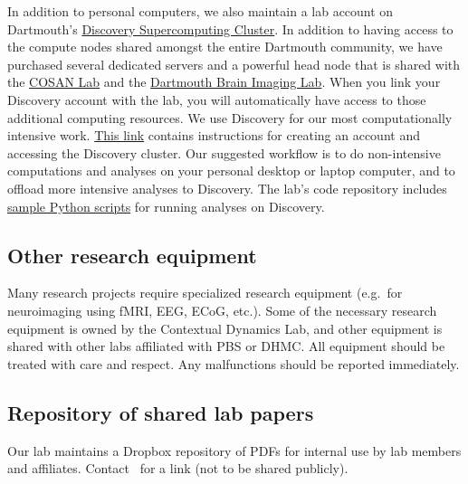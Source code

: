 \documentclass{tufte-book} %
\begin{document}
 In addition to personal computers, we also maintain a lab account on
 Dartmouth's \href{http://techdoc.dartmouth.edu/discovery/}{Discovery
   Supercomputing Cluster}.  In addition to having access to the
 compute nodes shared amongst the entire Dartmouth community, we have
 purchased several dedicated servers and a powerful head node that is
 shared with the \href{http://www.cosanlab.com/}{COSAN Lab} and the
 \href{http://www.dartmouth.edu/~bil/}{Dartmouth Brain Imaging Lab}.
 When you link your Discovery account with the lab, you will
 automatically have access to those additional computing resources.
 We use Discovery for our most computationally intensive work.
 \href{https://rc.dartmouth.edu/index.php/discovery-overview/accessing-the-cluster}{This
   link} contains instructions for creating an account and
 accessing %
 the Discovery cluster.  Our suggested workflow is to do non-intensive
 computations and analyses on your personal desktop or laptop
 computer, and to offload more intensive analyses to Discovery.  The
 lab's code repository includes
 \href{https://github.com/ContextLab/cluster-tools-dartmouth}{sample
   Python scripts} for running analyses on Discovery.

 \subsection{Other research equipment}
 Many research projects require specialized research equipment (e.g.\
 for neuroimaging using fMRI, EEG, ECoG, etc.).  Some of the necessary
 research equipment is owned by the Contextual Dynamics Lab, and other
 equipment is shared with other labs affiliated with PBS or DHMC.  All
 equipment should be treated with care and respect.  Any malfunctions
 should be reported immediately.

\subsection{Repository of shared lab papers}
Our lab maintains a Dropbox repository of PDFs for internal use by lab
members and affiliates. Contact \director~for a link (not to be shared
publicly).
\end{document}
